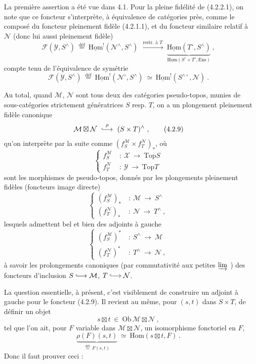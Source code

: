 \documentclass[11pt]{article}
\newcommand{\printedpage}[1]{\if\relax\detokenize{#1}\relax\else\marginpar{\footnotesize p.~#1}\fi}
\newcommand{\msp}[1]{\marginpar{\footnotesize [#1]}}
\newcommand{\uHom}{\underline{\mathrm{Hom}}}
\newcommand{\Ens}{\mathrm{Ens}}
\newcommand{\cM}{\mathcal{M}}
\newcommand{\cN}{\mathcal{N}}
\newcommand{\cX}{\mathcal{X}}
\newcommand{\cY}{\mathcal{Y}}
\newcommand{\cF}{\mathcal{F}}
\newcommand{\Hom}{\mathrm{Hom}}
\newcommand{\Top}{\mathrm{Top}}
\newcommand{\Ob}{\mathrm{Ob}\,}
\newcommand{\defeq}{\overset{\text{déf}}{=}}
\newcommand{\bt}{\boxtimes}
\newcommand{\linj}{\lhook\joinrel\longrightarrow}
\begin{document}
La première assertion a été vue dans 4.1. Pour la pleine fidélité de (4.2.2.1), on note que ce foncteur s'interprète, à équivalence de catégories près, comme le composé du foncteur pleinement fidèle (4.2.1.1), et du foncteur
\msp{page 62}
similaire relatif à $\cN$ (donc lui aussi pleinement fidèle)
\[
\cF(\cY,S^{\wedge}) \ \defeq\ \uHom^{!}(\cN^{\wedge},S^{\wedge}) \ \xrightarrow{\ \text{restr. à } T\ }\ \underbrace{\uHom(T^{\circ},S^{\wedge})}_{\uHom(S^{\circ}\times T^{\circ},\Ens)} \ ,
\tag*{(4.2.2.2)} %
\]
compte tenu de l'équivalence de symétrie
\[
\cF(\cY,S^{\wedge}) \ \defeq\ \uHom^{!}(\cN^{\circ},S^{\wedge}) \ \simeq\ \uHom^{!}(S^{\wedge\circ},\cN) \ .
\tag*{(4.2.2.3)}
\]

Au total, quand $\cM$, $\cN$ sont tous deux des catégories pseudo-topos, munies de sous-catégories strictement génératrices $S$ resp. $T$, on a un plongement pleinement fidèle canonique
\[
\cM\bt\cN \ \overset{\rho}{\linj}\ (S\times T)^{\wedge} \ ,
\tag*{(4.2.9)}
\]
\printedpage{7}
qu'on interprète par la suite comme $(f_{S}^{\cM}\times f_{T}^{\cN})_{*}$, où
\[
\left\{
\begin{aligned}
f_{S}^{\cM} \ &:\ \cX \ \longrightarrow\ \Top S\\
f_{T}^{\cN} \ &:\ \cY \ \longrightarrow\ \Top T
\end{aligned}
\right.
\tag*{(4.2.10)}
\]
sont les morphismes de pseudo-topos, donnés par les plongements pleinement fidèles (foncteurs image directe)
\[
\left\{
\begin{aligned}
(f_{S}^{\cM})_{*} \ &:\ \cM \ \longrightarrow\ S^{\wedge}\\
(f_{T}^{\cN})_{*} \ &:\ \cN \ \longrightarrow\ T^{\wedge} \ ,
\end{aligned}
\right.
\tag*{(4.2.11)}
\]
lesquels admettent bel et bien des adjoints à gauche
\msp{page 63}
\[
\left\{
\begin{aligned}
(f_{S}^{\cM})^{*} \ &:\ S^{\wedge} \ \longrightarrow\ \cM\\
(f_{T}^{\cN})^{*} \ &:\ T^{\wedge} \ \longrightarrow\ \cN \ ,
\end{aligned}
\right.
\tag*{(4.2.12)}
\]
à savoir les prolongements canoniques (par commutativité aux petites $\varinjlim$ ) des foncteurs d'inclusion $S \linj \cM$, $T \linj \cN$.

La question essentielle, à présent, c'est visiblement de construire un adjoint à gauche pour le foncteur (4.2.9). Il revient au même, pour $(s,t)$ dans $S\times T$, de définir un objet
\[
s\bt t \ \in\ \Ob\cM\bt\cN \ ,
\tag*{(4.2.13)}
\]
tel que l'on ait, pour $F$ variable dans $\cM\bt\cN$, un isomorphisme fonctoriel en $F$,
\[
\underbrace{\rho(F)(s,t)}_{\defeq\, F(s,t)} \ \simeq\ \Hom(s\bt t,F) \ .
\]
Donc il faut prouver ceci :
\end{document}
